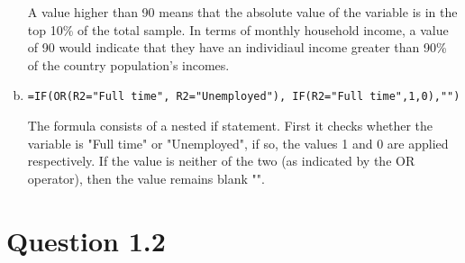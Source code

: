 \documentclass[11pt,a4paper]{article}
\newcommand{\formula}[1]{\small\texttt{#1}\normalsize}
\newcommand{\itemspace}{\vspace{1em}\item}
\begin{document}
\begin{enumerate}[a)]
    A value higher than 90 means that the absolute value of the variable is in
    the top 10\% of the total sample. In terms of monthly household income, a
    value of 90 would indicate that they have an individiaul income greater
    than 90\% of the country population's incomes.
    
  \itemspace 

     \par 
    
    \begin{center}
    \formula{=IF(OR(R2="Full time", R2="Unemployed"), IF(R2="Full
    time",1,0),"")} 
    \end{center}\par
    
     \par 

    The formula consists of a nested if statement. First it checks whether the
    variable is "Full time" or "Unemployed", if so, the values 1 and 0 are
    applied respectively. If the value is neither of the two (as indicated by
    the OR operator), then the value remains blank "". 

\end{enumerate}



\newpage
\section*{Question 1.2}
\end{document}
